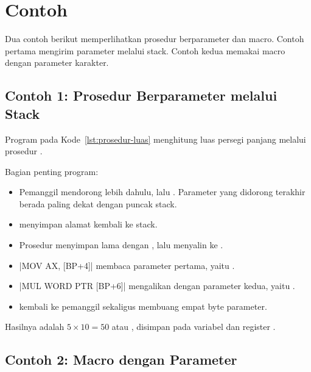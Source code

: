 \section{Contoh}
\label{sec:contoh-bab14}

Dua contoh berikut memperlihatkan prosedur berparameter dan macro.
Contoh pertama mengirim parameter melalui stack. Contoh kedua
memakai macro dengan parameter karakter.

\subsection{Contoh 1: Prosedur Berparameter melalui Stack}

Program pada Kode~\ref{lst:prosedur-luas} menghitung luas persegi
panjang melalui prosedur .



Bagian penting program:

\begin{itemize}
    \item Pemanggil mendorong  lebih dahulu, lalu
          . Parameter yang didorong terakhir berada paling
          dekat dengan puncak stack.
    \item {} menyimpan alamat kembali ke stack.
    \item Prosedur menyimpan  lama dengan , lalu
          menyalin  ke .
    \item \lstasm|MOV AX, [BP+4]| membaca parameter pertama, yaitu
          .
    \item \lstasm|MUL WORD PTR [BP+6]| mengalikan dengan parameter
          kedua, yaitu .
    \item {}  kembali ke pemanggil sekaligus membuang
          empat byte parameter.
\end{itemize}

Hasilnya adalah $5 \times 10 = 50$ atau , disimpan pada
variabel  dan register .

\subsection{Contoh 2: Macro dengan Parameter}

